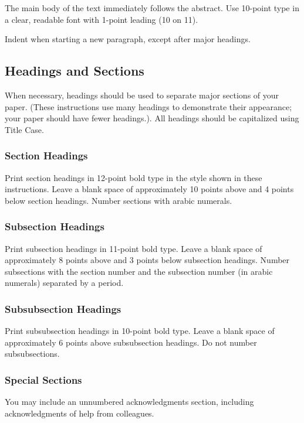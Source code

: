 \documentclass{article}
\begin{document}
The main body of the text immediately follows the abstract. Use
10-point type in a clear, readable font with 1-point leading (10 on
11).

Indent when starting a new paragraph, except after major headings.

\subsection{Headings and Sections}

When necessary, headings should be used to separate major sections of
your paper. (These instructions use many headings to demonstrate their
appearance; your paper should have fewer headings.). All headings should be capitalized using Title Case.

\subsubsection{Section Headings}

Print section headings in 12-point bold type in the style shown in
these instructions. Leave a blank space of approximately 10 points
above and 4 points below section headings.  Number sections with
arabic numerals.

\subsubsection{Subsection Headings}

Print subsection headings in 11-point bold type. Leave a blank space
of approximately 8 points above and 3 points below subsection
headings. Number subsections with the section number and the
subsection number (in arabic numerals) separated by a
period.

\subsubsection{Subsubsection Headings}

Print subsubsection headings in 10-point bold type. Leave a blank
space of approximately 6 points above subsubsection headings. Do not
number subsubsections.

\subsubsection{Special Sections}

You may include an unnumbered acknowledgments section, including
acknowledgments of help from colleagues.
\end{document}
